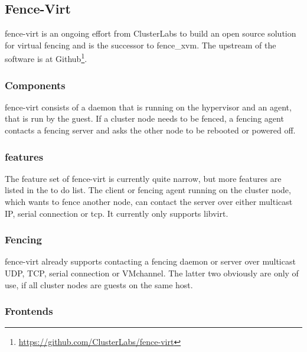 \subsection{Fence-Virt}
fence-virt is an ongoing effort from ClusterLabs to build an open source solution
for virtual fencing and is the successor to fence\_xvm. 
The upstream of the software is at Github\footnote{\url{https://github.com/ClusterLabs/fence-virt}}.

\subsubsection{Components}
fence-virt consists of a daemon that is running on the hypervisor and 
an agent, that is run by the guest. If a cluster node needs to be fenced,
a fencing agent contacts a fencing server and asks the other node to
be rebooted or powered off.

\subsubsection{features}
The feature set of fence-virt is currently quite narrow, but more features are listed
in the to do list.
The client or fencing agent running on the cluster node, which wants to fence
another node, can contact the server over either multicast IP, serial connection or
tcp. It currently only supports libvirt.

\subsubsection{Fencing}
fence-virt already supports contacting a fencing daemon or server over
multicast UDP, TCP, serial connection or VMchannel. The latter two obviously are only
of use, if all cluster nodes are guests on the same host.

\subsubsection{Frontends}
